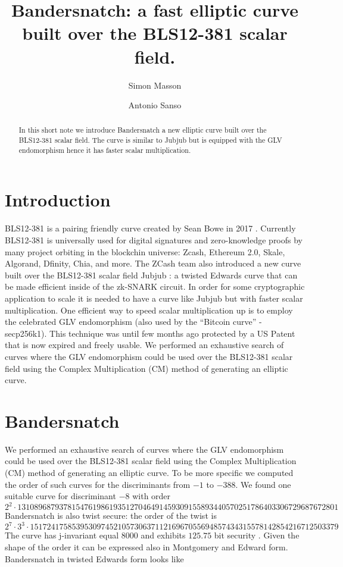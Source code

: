 \documentclass{amsart}
\begin{document}
\title[Bandersnatch]{Bandersnatch: a fast elliptic curve built over the BLS12-381 scalar field.}
\author{Simon Masson}
\address{Heliax}
\author{Antonio Sanso}
\address{Ethereum Foundation and Ruhr Universit{\"a}t Bochum}


\maketitle
\medskip
\begin{abstract}
 In this short note we  introduce Bandersnatch a new elliptic curve built over the BLS12-381 \cite{bls12381} scalar field. The curve is similar to Jubjub \cite{jubjub} but is equipped with the GLV endomorphism \cite{10.1007/3-540-44647-8_11} hence it has faster scalar multiplication.
 \end{abstract}

\section{Introduction} 
BLS12-381 is a pairing friendly curve created by Sean Bowe in 2017 \cite{bls12381}. Currently BLS12-381 is universally used for digital signatures and zero-knowledge proofs by many project orbiting in the 
blockchin universe: Zcash, Ethereum 2.0, Skale, Algorand, Dfinity, Chia, and more. The ZCash team also introduced a new curve built over the BLS12-381 scalar field Jubjub  \cite{jubjub}: a twisted Edwards curve that can be made efficient inside of the zk-SNARK circuit.
In order for some cryptographic application to scale it is needed to have a curve like Jubjub but with faster scalar multiplication. One efficient way to speed scalar multiplication up is to employ the celebrated GLV endomorphism \cite{10.1007/3-540-44647-8_11} (also used by the “Bitcoin curve” - secp256k1). This technique was until few months ago protected by a US Patent that is now expired and freely usable.
We performed an exhaustive search of curves where the GLV endomorphism could be used over the BLS12-381 scalar field using the Complex Multiplication (CM) method of generating an elliptic curve. 

\section{Bandersnatch} 

We performed an exhaustive search of curves where the GLV endomorphism could be used over the BLS12-381 scalar field using the Complex Multiplication (CM) method of generating an elliptic curve. To be more specific we computed the order of such curves for the discriminants from $-1$ to $-388$.
We found one suitable curve for discriminant $-8$ with order 
$$2^2\cdot 13108968793781547619861935127046491459309155893440570251786403306729687672801$$
Bandersnatch is also twist secure: the order of the twist is $$2^7 \cdot 3^3 \cdot 15172417585395309745210573063711216967055694857434315578142854216712503379$$
The curve has j-invariant equal $8000$ and exhibits $125.75$ bit security  . Given the shape of the order it can be expressed also in Montgomery and Edward form. 
Bandersnatch in twisted Edwards form looks like
\end{document}
